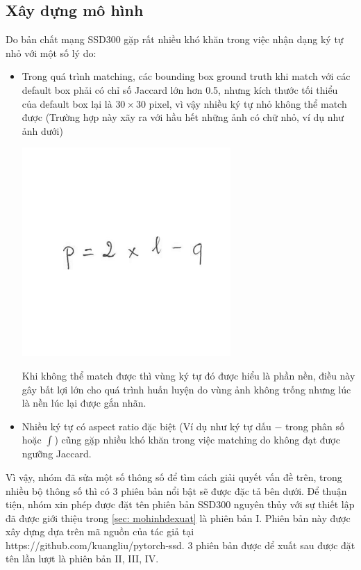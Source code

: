 \documentclass[a4paper,12pt]{article}
\begin{document}
	\newpage
	\subsection{Xây dựng mô hình}
	\label{subsec: xaydungmohinh}
	Do bản chất mạng SSD300\cite{liu2016ssd} gặp rất nhiều khó khăn trong việc nhận dạng ký tự nhỏ với một số lý do:
	\begin{itemize}
		\item Trong quá trình matching, các bounding box ground truth khi match với các default box phải có chỉ số Jaccard\cite{Jaccard} lớn hơn 0.5, nhưng kích thước tối thiểu của default box lại là $30 \times 30$ pixel, vì vậy nhiều ký tự nhỏ không thể match được (Trường hợp này xãy ra với hầu hết những ảnh có chữ nhỏ, ví dụ như ảnh dưới)
		\begin{center}
			\centering
			\includegraphics[resolution=300]{HMER_2017_TEST1_MINH_01_2A.png}
			\vspace{0.5cm}
		\end{center}
		Khi không thể match được thì vùng ký tự đó được hiểu là phần nền, điều này gây bất lợi lớn cho quá trình huấn luyện do vùng ảnh không trống nhưng lúc là nền lúc lại được gắn nhãn.
		
		\item Nhiều ký tự có aspect ratio đặc biệt (Ví dụ như ký tự dấu $-$ trong phân số hoặc $\int$) cũng gặp nhiều khó khăn trong việc matching do không đạt được ngưỡng Jaccard\cite{Jaccard}.
	\end{itemize}
	Vì vậy, nhóm đã sửa một số thông số để tìm cách giải quyết vấn đề trên, trong nhiều bộ thông số thì có 3 phiên bản nổi bật sẽ được đặc tả bên dưới. Để thuận tiện, nhóm xin phép được đặt tên phiên bản SSD300 nguyên thủy\cite{liu2016ssd} với sự thiết lập đã được giới thiệu trong \ref{sec: mohinhdexuat} là phiên bản I. Phiên bản này được xây dựng dựa trên mã nguồn của tác giả tại https://github.com/kuangliu/pytorch-ssd. 3 phiên bản được dể xuất sau được đặt tên lần lượt là phiên bản II, III, IV.
	
\end{document}
